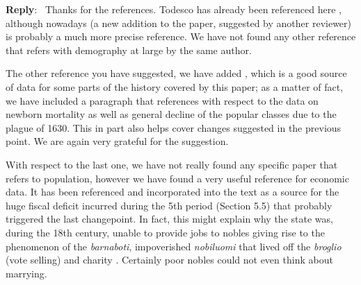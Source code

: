 \documentclass[11pt]{article}
\newcounter{reviewer}
\newcounter{point}[reviewer]
\newenvironment{reply}
   {\medskip \noindent \begin{sf}\textbf{Reply}:\  }
   {\medskip \end{sf}}
\begin{document}
\begin{reply}
  Thanks for the references. Todesco has already been referenced here
  \cite{todesco1989andamento}, although nowadays \cite{raines2003cooptazione} (a
  new addition to the paper, suggested by another reviewer) is probably a much
  more precise reference. We have not found any other reference that refers with
  demography at large by the same author.

  The other reference you have suggested, we have added
  \cite{beltrami1951composizione}, which is a good source of data for some parts
  of the history covered by this paper; as a matter of fact, we have included a
  paragraph that references with respect to the data on newborn mortality as
  well as general decline of the popular classes due to the plague of 1630. This
  in part also helps cover changes suggested in the previous point. We are again
  very grateful for the suggestion.

  With respect to the last one, we have not really found any specific paper that
  refers to population, however we have found \cite{pezzolo2006rise} a very
  useful reference for economic data. It has been referenced and incorporated
  into the text as a source for the huge fiscal deficit incurred during the 5th
  period (Section 5.5) that probably triggered the last changepoint. In fact,
  this might explain why the state was, during the 18th century, unable to
  provide jobs to nobles giving rise to the phenomenon of the {\em barnaboti},
  impoverished {\em nobiluomi} that lived off the {\em broglio} (vote selling)
  and charity \cite{zennaro2018ritratto}. Certainly poor nobles could not even
  think about marrying.
\end{reply}




\end{document}

